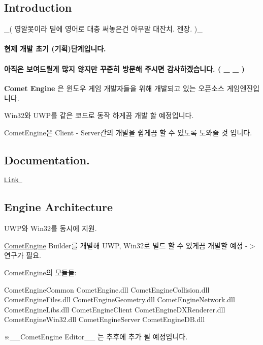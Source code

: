 \subsection*{Introduction}

\+\_\+( 영알못이라 밑에 영어로 대충 써놓은건 아무말 대잔치. 젠장. )\+\_\+

\paragraph*{현제 개발 초기 (기획)단계입니다.}

\paragraph*{아직은 보여드릴게 많지 않지만 꾸준히 방문해 주시면 감사하겠습니다. ( \+\_\+ \+\_\+ )}

{\bfseries Comet Engine} 은 윈도우 게임 개발자들을 위해 개발되고 있는 오픈소스 게임엔진입니다.

Win32와 U\+W\+P를 같은 코드로 동작 하게끔 개발 할 예정입니다.

Comet\+Engine은 Client -\/ Server간의 개발을 쉽게끔 할 수 있도록 도와줄 것 입니다.

\subsection*{Documentation.}

\href{https://devsdk.github.io/CometEngine/html/index.html}{\tt Link }

\subsection*{Engine Architecture}

U\+W\+P와 Win32를 동시에 지원.

\hyperlink{namespace_comet_engine}{Comet\+Engine} Builder를 개발해 U\+WP, Win32로 빌드 할 수 있게끔 개발할 예정 -\/$>$ 연구가 필요.

Comet\+Engine의 모듈들\+: \begin{DoxyVerb}CometEngineCommon
    CometEngine.dll
    CometEngineCollision.dll
    CometEngineFiles.dll
    CometEngineGeometry.dll
    CometEngineNetwork.dll
    CometEngineLibs.dll
CometEngineClient
    CometEngineDXRenderer.dll
    CometEngineWin32.dll
CometEngineServer
    CometEngineDB.dll
\end{DoxyVerb}


※\+\_\+\+\_\+\+Comet\+Engine Editor\+\_\+\+\_\+ 는 추후에 추가 될 예정입니다.

